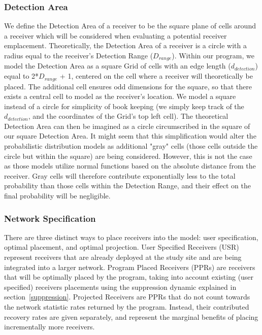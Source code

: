 \subsubsection{Detection Area}
\label{detectionArea}
We define the Detection Area of a receiver to be the square plane of cells around a receiver which will be considered when evaluating a potential receiver emplacement.  Theoretically, the Detection Area of a receiver is a circle with a radius equal to the receiver's Detection Range ($D_{range}$).  Within our program, we model the Detection Area as a square Grid of cells with an edge length ($d_{detection}$) equal to 2*$D_{range}$ + 1, centered on the cell where a receiver will theoretically be placed.  The additional cell ensures odd dimensions for the square, so that there exists a central cell to model as the receiver's location.  We model a square instead of a circle for simplicity of book keeping (we simply keep track of the $d_{detection}$, and the coordinates of the Grid's top left cell).  The theoretical Detection Area can then be imagined as a circle circumscribed in the square of our square Detection Area.  It might seem that this simplification would alter the probabilistic distribution models as additional "gray" cells (those cells outside the circle but within the square) are being considered.  However, this is not the case as those models utilize normal functions based on the absolute distance from the receiver.  Gray cells will therefore contribute exponentially less to the total probability than those cells within the Detection Range, and their effect on the final probability will be negligible.  

\subsubsection{Network Specification}
There are three distinct ways to place receivers into the model: user specification, optimal placement, and optimal projection.  User Specified Receivers (USR) represent receivers that are already deployed at the study site and are being integrated into a larger network.    Program Placed Receivers (PPRs) are receivers that will be  optimally placed by the program, taking into account existing (user specified) receivers placements using the suppression dynamic explained in section~\ref{suppression}.  Projected Receivers are PPRs that do not count towards the network statistic rates returned by the program.  Instead, their contributed recovery rates are given separately, and represent the marginal benefits of placing incrementally more receivers.  


